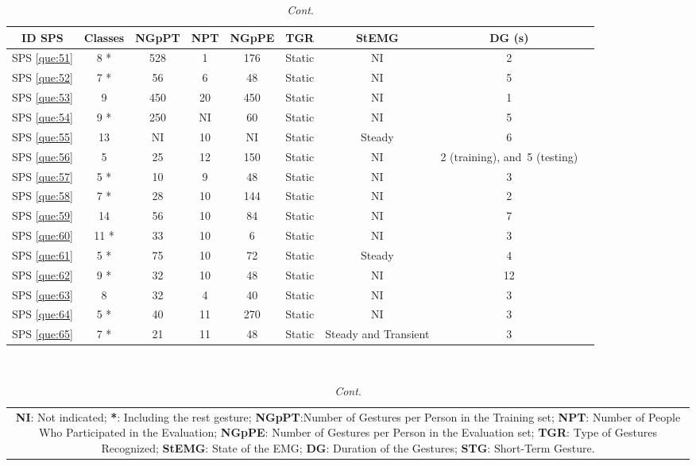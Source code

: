 \documentclass[sensors,review,accept,moreauthors,pdftex]{Definitions/mdpi}
\begin{document}
\begin{table}[H]\ContinuedFloat
\centering
\caption{\textit{Cont}.}
\begin{tabular}{ccccccccc}
	\toprule
	
	\textbf{ID SPS}&\textbf{Classes}&\textbf{NGpPT}&\textbf{NPT} &\textbf{NGpPE}&\textbf{TGR}&\textbf{StEMG}&\textbf{DG (s)}\\
	\midrule

	
	SPS \ref{que:51}	&	8 *	&	528	&	1	&	176	&	Static	&	NI	&	2	\\	
	SPS \ref{que:52}	&	7 *	&	56	&	6	&	48	&	Static	&	NI	&	5	\\	
	SPS \ref{que:53}	&	9	&	450	&	20	&	450	&	Static	&	NI	&	1	\\	
	SPS \ref{que:54}	&	9 *	&	250	&	NI	&	60	&	Static	&	NI	&	5	\\	
	SPS \ref{que:55}	&	13	&	NI	&	10	&	NI	&	Static	&	Steady	&	6	\\	
	SPS \ref{que:56}	&	5	&	25	&	12	&	150	&	Static	&	NI	&	2 (training), and~5 (testing)	\\	
	
	
	SPS \ref{que:57}	&	5 *	&	10	&	9	&	48	&	Static	&	NI	&	3	\\	
	SPS \ref{que:58}	&	7 *	&	28	&	10	&	144	&	Static	&	NI	&	2	\\	
	SPS \ref{que:59}	&	14	&	56	&	10	&	84	&	Static	&	NI	&	7	\\	
	SPS \ref{que:60}	&	11 *	&	33	&	10	&	6	&	Static	&	NI	&	3	\\	
	SPS \ref{que:61}	&	5 *	&	75	&	10	&	72	&	Static	&	Steady	&	4	\\	
	SPS \ref{que:62}	&	9 *	&	32	&	10	&	48	&	Static	&	NI	&	12	\\	
	SPS \ref{que:63}	&	8	&	32	&	4	&	40	&	Static	&	NI	&	3	\\	
	SPS \ref{que:64}	&	5 *	&	40	&	11	&	270	&	Static	&	NI	&	3	\\	
	SPS \ref{que:65}	&	7 *	&	21	&	11	&	48	&	Static	&	Steady and Transient	&	3	\\	
			\bottomrule
	\end{tabular}\\
\begin{tabular}{@{}c@{}} 
\multicolumn{1}{p{\textwidth -.88in}}{\footnotesize \textbf{NI}: Not indicated; \textbf{*}: Including the rest gesture; \textbf{NGpPT}:Number of Gestures per Person in the Training set; \textbf{NPT}: Number of People Who Participated in the Evaluation; \textbf{NGpPE}: Number of Gestures per Person in the Evaluation set; \textbf{TGR}: Type of Gestures Recognized; \textbf{StEMG}: State of the EMG; \textbf{DG}: Duration of the Gestures; \textbf{STG}: Short-Term Gesture.}
\end{tabular}	
		
	
		
	
	
		
		

	
\end{table}
\end{document}
